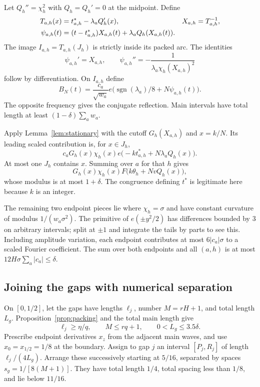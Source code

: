 \documentclass[11pt]{article}
\theoremstyle{remark}
\newcommand{\sgn}{\operatorname{sgn}}
\begin{document}
Let $Q_h''=\chi_h^2$ with $Q_h=Q_h'=0$ at the midpoint. Define
\begin{align}
 T_{a,h}(x)&=t^*_{a,h}-\lambda_a Q_h'(x),&
 X_{a,h}&=T_{a,h}^{-1},\notag\\
 \psi_{a,h}(t)&=(t-t^*_{a,h})X_{a,h}(t)
                   +\lambda_aQ_h(X_{a,h}(t)).        \label{eq:main-phase}
\end{align}
The image $I_{a,h}=T_{a,h}(J_h)$ is strictly inside its packed arc.
The identities
\[
 \psi_{a,h}'=X_{a,h},\qquad
 \psi_{a,h}''=-\frac1{\lambda_a\chi_h(X_{a,h})^2}
\]
follow by differentiation. On $I_{a,h}$ define
\begin{equation}\label{eq:main-BN}
 B_N(t)=\frac{c_a}{\sqrt{w_a}}
             e\bigl(\sgn(\lambda_a)/8+N\psi_{a,h}(t)\bigr).
\end{equation}
The opposite frequency gives the conjugate reflection. Main intervals
have total length at least $(1-\delta)\sum_aw_a$.

Apply Lemma~\ref{lem:stationary} with the cutoff $G_h(X_{a,h})$ and
$x=k/N$. Its leading scaled contribution is, for $x\in J_h$,
\[
 c_aG_h(x)\chi_h(x)
       e\bigl(-kt^*_{a,h}+N\lambda_aQ_h(x)\bigr).
\]
At most one $J_h$ contains $x$. Summing over $a$ for that $h$ gives
\begin{equation}\label{eq:coherence}
 G_h(x)\chi_h(x)F\bigl(k\theta_h+NvQ_h(x)\bigr),
\end{equation}
whose modulus is at most $1+\delta$. The congruence defining $t^*$ is
legitimate here because $k$ is an integer.

The remaining two endpoint pieces lie where $\chi_h=\sigma$ and have
constant curvature of modulus $1/(w_a\sigma^2)$. The primitive of
$e(\pm y^2/2)$ has differences bounded by $3$ on arbitrary intervals;
split at $\pm1$ and integrate the tails by parts to see this. Including
amplitude variation, each endpoint contributes at most $6|c_a|\sigma$
to a scaled Fourier coefficient. The sum over both endpoints and all
$(a,h)$ is at most $12H\sigma\sum_a|c_a|\le\delta$.

\subsection{Joining the gaps with numerical separation}

On $[0,1/2]$, let the gaps have lengths $\ell_j$, number $M=rH+1$, and
total length $L_g$. Proposition~\ref{prop:packing} and the total main
length give
\begin{equation}\label{eq:gap-lengths}
 \ell_j\ge\eta/q,\qquad M\le rq+1,\qquad 0<L_g\le3.5\delta.
\end{equation}
Prescribe endpoint derivatives $x_z$ from the adjacent main waves, and
use $x_0=x_{1/2}=1/8$ at the boundary. Assign to gap $j$ an interval
$[P_j,R_j]$ of length $\ell_j/(4L_g)$. Arrange these successively starting
at $5/16$, separated by spaces $s_g=1/[8(M+1)]$.
They have total length $1/4$, total spacing less than $1/8$, and lie
below $11/16$.
\end{document}
